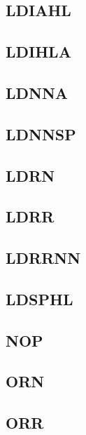 \documentclass[a4paper]{article}
\begin{document}
\subsection{LDIAHL}
\sailfclLDIAHLdecode
\sailfclLDIAHLassembly
\sailfclLDIAHLexecute
\subsection{LDIHLA}
\sailfclLDIHLAdecode
\sailfclLDIHLAassembly
\sailfclLDIHLAexecute
\subsection{LDNNA}
\sailfclLDNNAmakeLsbimmdecodeTwoFour
\sailfclLDNNAassembly
\sailfclLDNNAexecute
\subsection{LDNNSP}
\sailfclLDNNSPmakeLsbimmdecodeTwoFour
\sailfclLDNNSPassembly
\sailfclLDNNSPexecute
\subsection{LDRN}
\sailfclLDRNdecodeOneSix
\sailfclLDRNassembly
\sailfclLDRNexecute
\subsection{LDRR}
\sailfclLDRRdecode
\sailfclLDRRNNdecodeTwoFour
\sailfclLDRRassembly
\sailfclLDRRNNassembly
\sailfclLDRRexecute
\sailfclLDRRNNexecute
\subsection{LDRRNN}
\sailfclLDRRNNdecodeTwoFour
\sailfclLDRRNNassembly
\sailfclLDRRNNexecute
\subsection{LDSPHL}
\sailfclLDSPHLdecode
\sailfclLDSPHLassembly
\sailfclLDSPHLexecute
\subsection{NOP}
\sailfclNOPdecode
\sailfclNOPassembly
\sailfclNOPexecute
\subsection{ORN}
\sailfclORNimmdecodeOneSix
\sailfclORNassembly
\sailfclORNexecute
\subsection{ORR}
\sailfclORRrdecode
\sailfclORRassembly
\sailfclORRexecute
\end{document}
